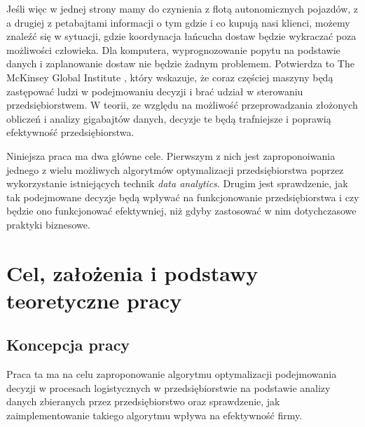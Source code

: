 \documentclass{article}
\begin{document}
Jeśli więc w jednej strony mamy do czynienia z flotą autonomicznych pojazdów, z a drugiej z petabajtami informacji o tym gdzie i co kupują nasi klienci, możemy znaleźć się w sytuacji, gdzie koordynacja łańcucha dostaw będzie wykraczać poza możliwości człowieka. Dla komputera, wyprognozowanie popytu na podstawie danych i zaplanowanie dostaw nie będzie żadnym problemem. Potwierdza to The McKinsey Global Institute \cite{McKinsey&Company2011}, który wskazuje, że coraz częściej maszyny będą zastępować ludzi w podejmowaniu decyzji i brać udział w sterowaniu przedsiębiorstwem. W teorii, ze względu na możliwość przeprowadzania złożonych obliczeń i analizy gigabajtów danych, decyzje te będą trafniejsze i poprawią efektywność przedsiębiorstwa. 

Niniejsza praca ma dwa główne cele. Pierwszym z nich jest zaproponoiwania jednego  z wielu możliwych algorytmów optymalizacji przedsiębiorstwa poprzez wykorzystanie  istniejących technik \textit{data analytics}. Drugim jest sprawdzenie, jak tak podejmowane decyzje będą wpływać na funkcjonowanie przedsiębiorstwa i czy będzie ono funkcjonować efektywniej, niż gdyby zastosować w nim dotychczasowe praktyki biznesowe.

\section{Cel, założenia i podstawy teoretyczne pracy}
\subsection{Koncepcja pracy}

Praca ta ma na celu zaproponowanie algorytmu optymalizacji podejmowania decyzji w procesach logistycznych w przedsiębiorstwie na podstawie analizy danych zbieranych przez przedsiębiorstwo oraz sprawdzenie, jak zaimplementowanie takiego algorytmu wpływa na efektywność firmy. 
\end{document}
